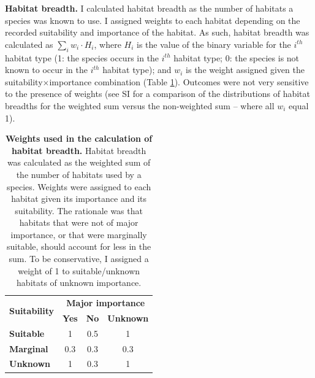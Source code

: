 \textbf{Habitat breadth.}
I calculated habitat breadth as the number of habitats a species was known to use. I assigned weights to each habitat depending on the recorded suitability and importance of the habitat. As such, habitat breadth was calculated as $\sum_{i} w_{i} \cdot H_{i}$, where $H_{i}$ is the value of the binary variable for the $i^{th}$ habitat type (1: the species occurs in the $i^{th}$ habitat type; 0: the species is not known to occur in the $i^{th}$ habitat type); and $w_{i}$ is the weight assigned given the suitability$\times$importance combination (Table \ref{table_weights}). Outcomes were not very sensitive to the presence of weights (see SI for a comparison of the distributions of habitat breadths for the weighted sum versus the non-weighted sum -- where all $w_{i}$ equal 1). 

\begin{table}[h!]
\renewcommand{\baselinestretch}{1}
\renewcommand{\arraystretch}{1.5}
\begin{center}\fontsize{9}{11}\selectfont
\caption[Weights used in the calculation of habitat breadth]{\textbf{Weights used in the calculation of habitat breadth.} Habitat breadth was calculated as the weighted sum of the number of habitats used by a species. Weights were assigned to each habitat given its importance and its suitability. The rationale was that habitats that were not of major importance, or that were marginally suitable, should account for less in the sum. To be conservative, I assigned a weight of 1 to suitable/unknown habitats of unknown importance.} 
\label{table_weights}
\begin{tabular}{|l|c|c|c|}
\hline
\multicolumn{1}{|c|}{\multirow{2}{*}{\textbf{Suitability}}} & \multicolumn{3}{c|}{\textbf{Major importance}} \\ \cline{2-4} 
\multicolumn{1}{|c|}{}                             & \textbf{Yes}       & \textbf{No}        & \textbf{Unknown}       \\ \hline
\textbf{Suitable}                                           & 1         & 0.5       & 1             \\ \hline
\textbf{Marginal}                                           & 0.3       & 0.3       & 0.3           \\ \hline
\textbf{Unknown}                                            & 1         & 0.3       & 1             \\ \hline
\end{tabular}
\end{center}
\end{table}

